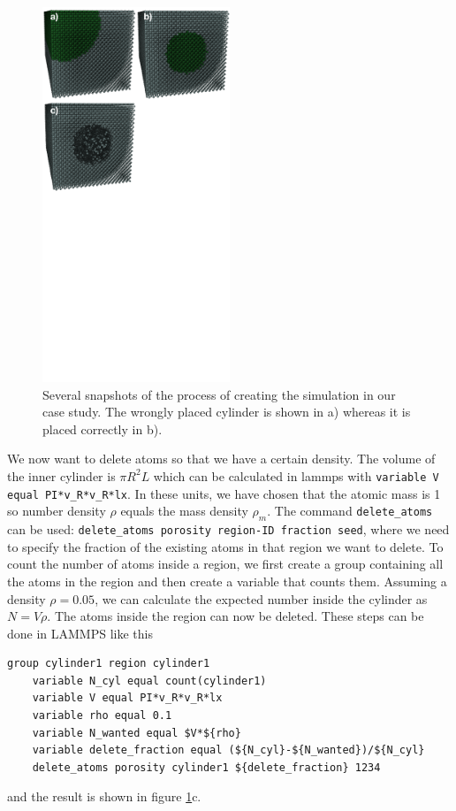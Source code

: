 \documentclass[aps,pre,twocolumn,letterpaper,floatfix,nofootinbib]{revtex4}
\newcommand{\code}[1]{\colorbox{light-gray}{\color{RawSienna}\texttt{#1}}}
\begin{document}
\begin{figure}
	\centering
	\includegraphics[width=0.5\textwidth]{figures/initial_configuration.pdf}
	\caption{
		Several snapshots of the process of creating the simulation in our case study.
		The wrongly placed cylinder is shown in a) whereas it is placed correctly in b).
    }
	\label{fig:initial_configuration}
\end{figure}

We now want to delete atoms so that we have a certain density. The volume of the inner cylinder is $\pi R^2 L$ which can be calculated in lammps with \code{variable V equal PI*v\_R*v\_R*lx}.
In these units, we have chosen that the atomic mass is 1 so number density $\rho$ equals the mass density $\rho_m$.
The command \code{delete\_atoms} can be used: \code{delete\_atoms porosity region-ID fraction seed}, where we need to specify the fraction of the existing atoms in that region we want to delete.
To count the number of atoms inside a region, we first create a group containing all the atoms in the region and then create a variable that counts them.
Assuming a density $\rho = 0.05$, we can calculate the expected number inside the cylinder as $N = V\rho$.
The atoms inside the region can now be deleted. These steps can be done in LAMMPS like this
\begin{lstlisting}[basicstyle=\tiny, frame = none, numbers=none, framexleftmargin=0pt, xleftmargin=-0.75cm, xrightmargin=0.0cm]
	group cylinder1 region cylinder1
	variable N_cyl equal count(cylinder1)
	variable V equal PI*v_R*v_R*lx
	variable rho equal 0.1
	variable N_wanted equal $V*${rho}
	variable delete_fraction equal (${N_cyl}-${N_wanted})/${N_cyl}
	delete_atoms porosity cylinder1 ${delete_fraction} 1234
\end{lstlisting}
and the result is shown in figure \ref{fig:initial_configuration}c.
\end{document}
